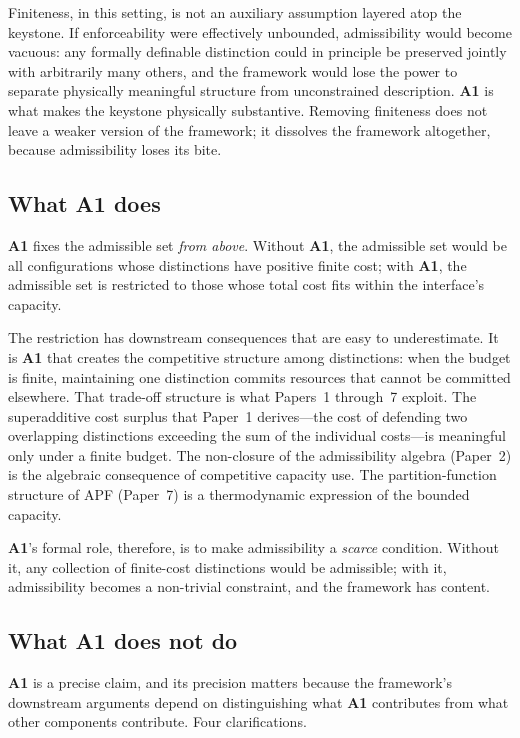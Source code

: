 \documentclass[11pt]{article}
\newcommand{\Aone}{\textbf{A1}}
\begin{document}
Finiteness, in this setting, is not an auxiliary assumption layered atop the keystone. If enforceability were effectively unbounded, admissibility would become vacuous: any formally definable distinction could in principle be preserved jointly with arbitrarily many others, and the framework would lose the power to separate physically meaningful structure from unconstrained description. \Aone{} is what makes the keystone physically substantive. Removing finiteness does not leave a weaker version of the framework; it dissolves the framework altogether, because admissibility loses its bite.

\subsection{What A1 does}\label{sec:A1_does}

\Aone{} fixes the admissible set \emph{from above}. Without \Aone{}, the admissible set would be all configurations whose distinctions have positive finite cost; with \Aone{}, the admissible set is restricted to those whose total cost fits within the interface's capacity.

The restriction has downstream consequences that are easy to underestimate. It is \Aone{} that creates the competitive structure among distinctions: when the budget is finite, maintaining one distinction commits resources that cannot be committed elsewhere. That trade-off structure is what Papers~1 through~7 exploit. The superadditive cost surplus that Paper~1 derives---the cost of defending two overlapping distinctions exceeding the sum of the individual costs---is meaningful only under a finite budget. The non-closure of the admissibility algebra (Paper~2) is the algebraic consequence of competitive capacity use. The partition-function structure of APF (Paper~7) is a thermodynamic expression of the bounded capacity.

\Aone{}'s formal role, therefore, is to make admissibility a \emph{scarce} condition. Without it, any collection of finite-cost distinctions would be admissible; with it, admissibility becomes a non-trivial constraint, and the framework has content.

\subsection{What A1 does not do}\label{sec:A1_does_not}

\Aone{} is a precise claim, and its precision matters because the framework's downstream arguments depend on distinguishing what \Aone{} contributes from what other components contribute. Four clarifications.
\end{document}
